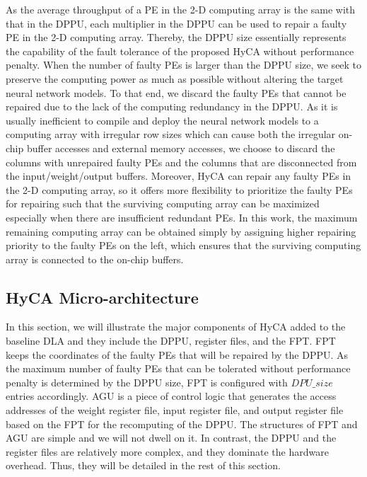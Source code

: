 As the average throughput of a PE in the 2-D computing array is the same with that in the DPPU, each multiplier in the DPPU can be used to repair a faulty PE in the 2-D computing array. Thereby, the DPPU size essentially represents the capability of the fault tolerance of the proposed HyCA without performance penalty. When the number of faulty PEs is larger than the DPPU size, we seek to preserve the computing power as much as possible without altering the target neural network models. To that end, we discard the faulty PEs that cannot be repaired due to the lack of the computing redundancy in the DPPU. As it is usually inefficient to compile and deploy the neural network models to a computing array with irregular row sizes which can cause both the irregular on-chip buffer accesses and external memory accesses, we choose to discard the columns with unrepaired faulty PEs and the columns that are disconnected from the input/weight/output buffers. Moreover, HyCA can repair any faulty PEs in the 2-D computing array, so it offers more flexibility to prioritize the faulty PEs for repairing such that the surviving computing array can be maximized especially when there are insufficient redundant PEs. In this work, the maximum remaining computing array can be obtained simply by assigning higher repairing priority to the faulty PEs on the left, which ensures that the surviving computing array is connected to the on-chip buffers. 

\subsection{HyCA Micro-architecture}
In this section, we will illustrate the major components of HyCA added to the baseline DLA and they include the DPPU, register files, and the FPT. FPT keeps the coordinates of the faulty PEs that will be repaired by the DPPU. As the maximum number of faulty PEs that can be tolerated without performance penalty is determined by the DPPU size, FPT is configured with $DPU\_size$ entries accordingly. AGU is a piece of control logic that generates the access addresses of the weight register file, input register file, and output register file based on the FPT for the recomputing of the DPPU. The structures of FPT and AGU are simple and we will not dwell on it. In contrast, the DPPU and the register files are relatively more complex, and they dominate the hardware overhead. Thus, they will be detailed in the rest of this section.


